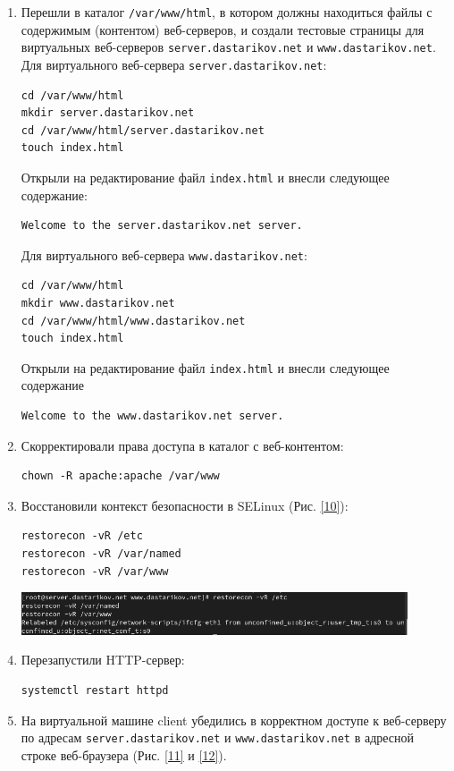 \begin{enumerate}
\item Перешли в каталог {\tt /var/www/html}, в котором должны находиться файлы с содержимым (контентом) веб-серверов, и создали тестовые страницы для виртуальных веб-серверов {\tt server.dastarikov.net} и {\tt www.dastarikov.net}.
Для виртуального веб-сервера {\tt server.dastarikov.net}:
\begin{verbatim}
cd /var/www/html
mkdir server.dastarikov.net
cd /var/www/html/server.dastarikov.net
touch index.html
\end{verbatim}
Открыли на редактирование файл {\tt index.html} и внесли следующее содержание:
\begin{verbatim}
Welcome to the server.dastarikov.net server.
\end{verbatim}
Для виртуального веб-сервера {\tt www.dastarikov.net}:
\begin{verbatim}
cd /var/www/html
mkdir www.dastarikov.net
cd /var/www/html/www.dastarikov.net
touch index.html
\end{verbatim}

Открыли на редактирование файл {\tt index.html} и внесли следующее содержание
\begin{verbatim}
Welcome to the www.dastarikov.net server.
\end{verbatim}

\item Скорректировали права доступа в каталог с веб-контентом:
\begin{verbatim}
chown -R apache:apache /var/www
\end{verbatim}
\item Восстановили контекст безопасности в SELinux (Рис. \ref{10}):
\begin{verbatim}
restorecon -vR /etc
restorecon -vR /var/named
restorecon -vR /var/www
\end{verbatim}

\begin{center}
    \centering
    \includegraphics[width=0.9\textwidth]{../images/image10.png}
    \label{10}
\end{center}

\item Перезапустили HTTP-сервер:
\begin{verbatim}
systemctl restart httpd
\end{verbatim}
\item На виртуальной машине client убедились в корректном доступе к веб-серверу по адресам {\tt server.dastarikov.net} и {\tt www.dastarikov.net} в адресной строке веб-браузера (Рис. \ref{11} и \ref{12}).


\end{enumerate}
